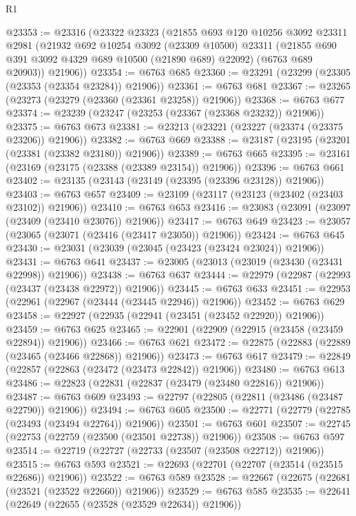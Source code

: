 \begin{lexlean}{R1}
\begin{coremodule}
@23353 := @23316
    (@23322
      @23323
      (@21855
        @693
        @120
        @10256
        @3092
        @23311
        @2981
        (@21932
          @692
          @10254
          @3092
          (@23309 @10500)
          @23311
          (@21855 @690 @391 @3092 @4329 @689 @10500 (@21890 @689) @22092)
          (@6763 @689 @20903))
        @21906))
@23354 := @6763 @685
@23360 := @23291 (@23299 (@23305 (@23353 (@23354 @23284)) @21906))
@23361 := @6763 @681
@23367 := @23265 (@23273 (@23279 (@23360 (@23361 @23258)) @21906))
@23368 := @6763 @677
@23374 := @23239 (@23247 (@23253 (@23367 (@23368 @23232)) @21906))
@23375 := @6763 @673
@23381 := @23213 (@23221 (@23227 (@23374 (@23375 @23206)) @21906))
@23382 := @6763 @669
@23388 := @23187 (@23195 (@23201 (@23381 (@23382 @23180)) @21906))
@23389 := @6763 @665
@23395 := @23161 (@23169 (@23175 (@23388 (@23389 @23154)) @21906))
@23396 := @6763 @661
@23402 := @23135 (@23143 (@23149 (@23395 (@23396 @23128)) @21906))
@23403 := @6763 @657
@23409 := @23109 (@23117 (@23123 (@23402 (@23403 @23102)) @21906))
@23410 := @6763 @653
@23416 := @23083 (@23091 (@23097 (@23409 (@23410 @23076)) @21906))
@23417 := @6763 @649
@23423 := @23057 (@23065 (@23071 (@23416 (@23417 @23050)) @21906))
@23424 := @6763 @645
@23430 := @23031 (@23039 (@23045 (@23423 (@23424 @23024)) @21906))
@23431 := @6763 @641
@23437 := @23005 (@23013 (@23019 (@23430 (@23431 @22998)) @21906))
@23438 := @6763 @637
@23444 := @22979 (@22987 (@22993 (@23437 (@23438 @22972)) @21906))
@23445 := @6763 @633
@23451 := @22953 (@22961 (@22967 (@23444 (@23445 @22946)) @21906))
@23452 := @6763 @629
@23458 := @22927 (@22935 (@22941 (@23451 (@23452 @22920)) @21906))
@23459 := @6763 @625
@23465 := @22901 (@22909 (@22915 (@23458 (@23459 @22894)) @21906))
@23466 := @6763 @621
@23472 := @22875 (@22883 (@22889 (@23465 (@23466 @22868)) @21906))
@23473 := @6763 @617
@23479 := @22849 (@22857 (@22863 (@23472 (@23473 @22842)) @21906))
@23480 := @6763 @613
@23486 := @22823 (@22831 (@22837 (@23479 (@23480 @22816)) @21906))
@23487 := @6763 @609
@23493 := @22797 (@22805 (@22811 (@23486 (@23487 @22790)) @21906))
@23494 := @6763 @605
@23500 := @22771 (@22779 (@22785 (@23493 (@23494 @22764)) @21906))
@23501 := @6763 @601
@23507 := @22745 (@22753 (@22759 (@23500 (@23501 @22738)) @21906))
@23508 := @6763 @597
@23514 := @22719 (@22727 (@22733 (@23507 (@23508 @22712)) @21906))
@23515 := @6763 @593
@23521 := @22693 (@22701 (@22707 (@23514 (@23515 @22686)) @21906))
@23522 := @6763 @589
@23528 := @22667 (@22675 (@22681 (@23521 (@23522 @22660)) @21906))
@23529 := @6763 @585
@23535 := @22641 (@22649 (@22655 (@23528 (@23529 @22634)) @21906))

\end{coremodule}
\end{lexlean}
